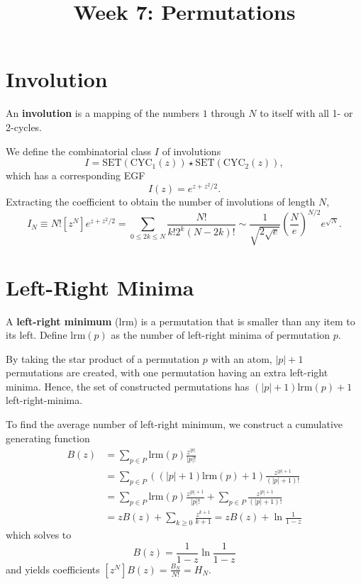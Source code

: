 \documentclass{article}
\begin{document}
\title{Week 7: Permutations}
\maketitle

\section{Involution}

An \textbf{involution} is a mapping of the numbers $1$ through $N$ to itself
with all 1- or 2-cycles.

We define the combinatorial class $I$ of involutions
\begin{equation*}
  I = \mathrm{SET}(\mathrm{CYC}_1(z)) \star \mathrm{SET}(\mathrm{CYC}_2(z)),
\end{equation*} which has a corresponding EGF \begin{equation*}
  I(z) = e^{z + z^2/2}.
\end{equation*} Extracting the coefficient to obtain the number of involutions
of length $N$, \begin{equation*}
I_N \equiv N![z^N]e^{z + z^2/2} = \sum_{0 \leq 2k \leq N}
\frac{N!}{k!2^k(N - 2k)!} \sim \frac{1}{\sqrt{2\sqrt{e}}}
\left(\frac{N}{e}\right)^{N/2}e^{\sqrt{N}}.
\end{equation*}

\section{Left-Right Minima}

A \textbf{left-right minimum} (lrm) is a permutation that is smaller than any
item to its left. Define $\mathrm{lrm}(p)$ as the number of left-right minima
of permutation $p$.

By taking the star product of a permutation $p$ with an atom, $|p| + 1$
permutations are created, with one permutation having an extra left-right
minima. Hence, the set of constructed permutations has $(|p| + 1)
\mathrm{lrm}(p) + 1$ left-right-minima.

To find the average number of left-right minimum, we construct a cumulative
generating function \begin{align*}
  B(z) &= \sum_{p \in P} \mathrm{lrm}(p)\frac{z^{|p|}}{|p|!} \\
       &= \sum_{p \in P} ((|p| + 1)\mathrm{lrm}(p) + 1)
       \frac{z^{|p| + 1}}{(|p| + 1)!} \\
       &= \sum_{p \in P} \mathrm{lrm}(p)\frac{z^{|p| + 1}}{|p|!} +
       \sum_{p \in P} \frac{z^{|p| + 1}}{(|p| + 1)!} \\
       &= zB(z) + \sum_{k \geq 0} \frac{z^{k + 1}}{k + 1} = zB(z) +
       \ln\frac{1}{1 - z}
\end{align*} which solves to \begin{equation*}
  B(z) = \frac{1}{1 - z}\ln\frac{1}{1 - z}
\end{equation*} and yields coefficients $[z^N]B(z) = \frac{B_N}{N!} = H_N$.
\end{document}
